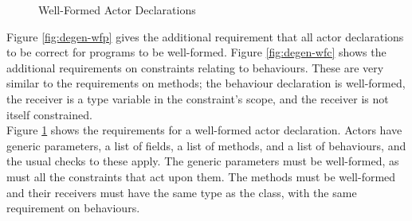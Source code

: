 \begin{figure}[H]
    \centering
    \begin{mathpar}
    \end{mathpar}
    \caption{Well-Formed Actor Declarations}
    \label{fig:degen-wfa}
\end{figure}

Figure \ref{fig:degen-wfp} gives the additional requirement that all actor declarations to be correct for programs to be well-formed. Figure \ref{fig:degen-wfc} shows the additional requirements on constraints relating to behaviours. These are very similar to the requirements on methods; the behaviour declaration is well-formed, the receiver is a type variable in the constraint's scope, and the receiver is not itself constrained. \\

Figure \ref{fig:degen-wfa}  shows the requirements for a well-formed actor declaration. Actors have generic parameters, a list of fields, a list of methods, and a list of behaviours, and the usual checks to these apply. The generic parameters must be well-formed, as must all the constraints that act upon them. The methods must be well-formed and their receivers must have the same type as the class, with the same requirement on behaviours.

